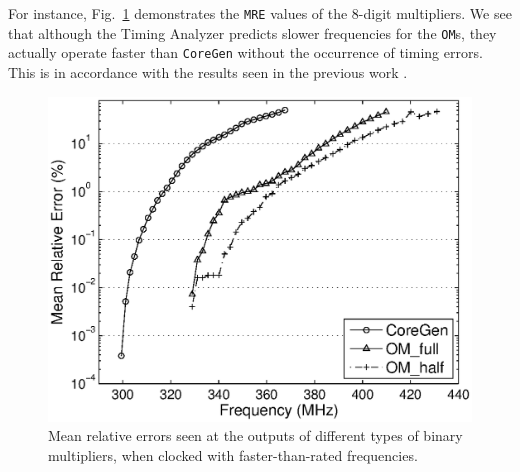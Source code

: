\documentclass[conference]{IEEEtran}
\begin{document}
For instance, Fig.~\ref{Fig:PM_MRE} demonstrates the \texttt{MRE} values of the 8-digit multipliers. We see that although the Timing Analyzer predicts slower frequencies for the \texttt{OM}s, they actually operate faster than \texttt{CoreGen} without the occurrence of timing errors. This is in accordance with the results seen in the previous work \cite{SKDAC14}.

\begin{figure}[tbp]
  \centering
  \includegraphics[width=.48\textwidth]{./Figures/Exp/MRE_PM.eps}
  \caption{Mean relative errors seen at the outputs of different types of binary multipliers, when clocked with faster-than-rated frequencies.}
  \label{Fig:PM_MRE}
  \vspace{-1ex}
\end{figure}




%
\end{document}
